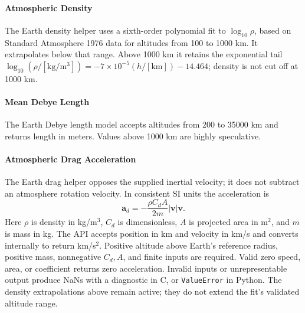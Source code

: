 \paragraph{Atmospheric Density}
The Earth density helper uses a sixth-order polynomial fit to $\log_{10}\rho$, based on Standard Atmosphere 1976 data for altitudes from 100 to 1000 km. It extrapolates below that range. Above 1000 km it retains the exponential tail $\log_{10}(\rho/[\mathrm{kg/m^3}])=-7\times10^{-5}(h/[\mathrm{km}])-14.464$; density is not cut off at 1000 km.

\paragraph{Mean Debye Length}
The Earth Debye length model accepts altitudes from 200 to 35000 km and returns length in meters. Values above 1000 km are highly speculative.

\paragraph{Atmospheric Drag Acceleration}
The Earth drag helper opposes the supplied inertial velocity; it does not subtract an atmosphere rotation velocity. In consistent SI units the acceleration is
\begin{equation}
	\bm a_{d} = -\frac{\rho C_{d} A}{2m} |\bm v|\bm v.
\end{equation}
Here $\rho$ is density in kg/m$^3$, $C_d$ is dimensionless, $A$ is projected area in m$^2$, and $m$ is mass in kg. The API accepts position in km and velocity in km/s and converts internally to return km/s$^2$. Positive altitude above Earth's reference radius, positive mass, nonnegative $C_d,A$, and finite inputs are required. Valid zero speed, area, or coefficient returns zero acceleration. Invalid inputs or unrepresentable output produce NaNs with a diagnostic in C, or {\tt ValueError} in Python. The density extrapolations above remain active; they do not extend the fit's validated altitude range.


